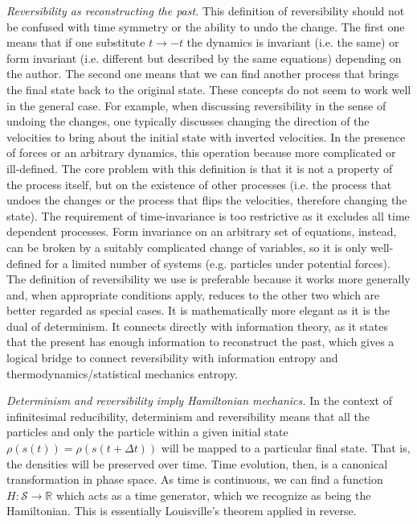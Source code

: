 \documentclass[twocolumn]{article}
\begin{document}
\emph{Reversibility as reconstructing the past.} This definition of reversibility should not be confused with time symmetry or the ability to undo the change. The first one means that if one substitute $t \to -t$ the dynamics is invariant (i.e. the same) or form invariant (i.e. different but described by the same equations) depending on the author. The second one means that we can find another process that brings the final state back to the original state. These concepts do not seem to work well in the general case. For example, when discussing reversibility in the sense of undoing the changes, one typically discusses changing the direction of the velocities to bring about the initial state with inverted velocities. In the presence of forces or an arbitrary dynamics, this operation because more complicated or ill-defined. The core problem with this definition is that it is not a property of the process itself, but on the existence of other processes (i.e. the process that undoes the changes or the process that flips the velocities, therefore changing the state). The requirement of time-invariance is too restrictive as it excludes all time dependent processes. Form invariance on an arbitrary set of equations, instead, can be broken by a suitably complicated change of variables, so it is only well-defined for a limited number of systems (e.g. particles under potential forces). The definition of reversibility we use is preferable because it works more generally and, when appropriate conditions apply, reduces to the other two which are better regarded as special cases. It is mathematically more elegant as it is the dual of determinism. It connects directly with information theory, as it states that the present has enough information to reconstruct the past, which gives a logical bridge to connect reversibility with information entropy and thermodynamics/statistical mechanics entropy.

\emph{Determinism and reversibility imply Hamiltonian mechanics.} In the context of infinitesimal reducibility, determinism and reversibility means that all the particles and only the particle within a given initial state $\rho(s(t)) = \rho(s(t+\Delta t))$ will be mapped to a particular final state. That is, the densities will be preserved over time. Time evolution, then, is a canonical transformation in phase space. As time is continuous, we can find a function $H : \mathcal{S} \to \mathbb{R}$ which acts as a time generator, which we recognize as being the Hamiltonian. This is essentially Louisville's theorem applied in reverse.
\end{document}
